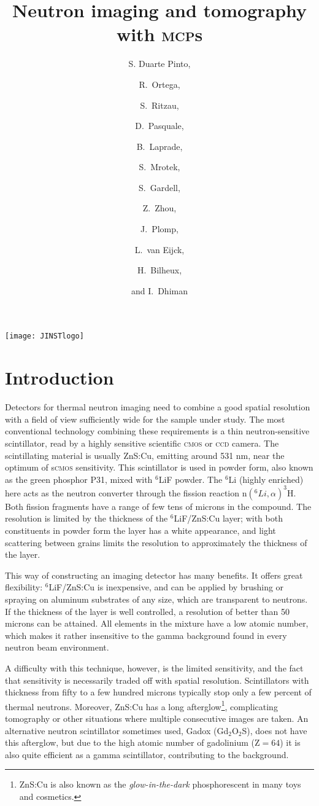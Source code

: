 \documentclass[a4paper,11pt]{article}
\title{\boldmath Neutron imaging and tomography with \textsc{mcp}s}
\author[a,1]{S. Duarte Pinto\note{Corresponding author.},}
\author[a]{R.~Ortega,}
\author[a]{S.~Ritzau,}
\author[a]{D.~Pasquale,}
\author[a]{B.~Laprade,}
\author[a]{S.~Mrotek,}
\author[a]{S.~Gardell,}
\author[b]{Z.~Zhou,}
\author[b]{J.~Plomp,}
\author[b]{L.~van Eijck,}
\author[c]{H.~Bilheux,}
\author[c]{and I.~Dhiman}
\affiliation[a]{\textsc{Photonis} Technologies S.A.S.,\\Avenue de Pythagore, 33700 M\'erignac, France}
\affiliation[b]{Delft University of Technology,\\ Mekelweg 15, 2629 JB Delft, the Netherlands}
\affiliation[c]{Oak Ridge National Laboratory,\\ 1 Bethel Valley Road, Oak Ridge, TN 37830, USA.}
\begin{document}
\noindent\texttt{[image: JINSTlogo]}\hfill
\maketitle
\section{Introduction}
Detectors for thermal neutron imaging need to combine a good spatial resolution with a field of view sufficiently wide for the sample under study.
The most conventional technology combining these requirements is a thin neutron-sensitive scintillator, read by a highly sensitive scientific \textsc{cmos} or \textsc{ccd} camera.
The scintillating material is usually ZnS:Cu, emitting around 531 nm, near the optimum of s\textsc{cmos} sensitivity.
This scintillator is used in powder form, also known as the green phosphor P31, mixed with $^6$LiF powder.
The $^6$Li (highly enriched) here acts as the neutron converter through the fission reaction $\textrm{n} (^6Li,\alpha) ^3\textrm{H}$.
Both fission fragments have a range of few tens of microns in the compound.
The resolution is limited by the thickness of the $^6$LiF/ZnS:Cu layer; with both constituents in powder form the layer has a white appearance, and light scattering between grains limits the resolution to approximately the thickness of the layer.

This way of constructing an imaging detector has many benefits.
It offers great flexibility: $^6$LiF/ZnS:Cu is inexpensive, and can be applied by brushing or spraying on aluminum substrates of any size, which are transparent to neutrons.
If the thickness of the layer is well controlled, a resolution of better than 50 microns can be attained.
All elements in the mixture have a low atomic number, which makes it rather insensitive to the gamma background found in every neutron beam environment.

A difficulty with this technique, however, is the limited sensitivity, and the fact that sensitivity is necessarily traded off with spatial resolution.
Scintillators with thickness from fifty to a few hundred microns typically stop only a few percent of thermal neutrons.
Moreover, ZnS:Cu has a long afterglow\footnote{ZnS:Cu is also known as the \emph{glow-in-the-dark} phosphorescent in many toys and cosmetics.}, complicating tomography or other situations where multiple consecutive images are taken.
An alternative neutron scintillator sometimes used, Gadox (Gd$_2$O$_2$S), does not have this afterglow, but due to the high atomic number of gadolinium ($\textrm{Z}=64$) it is also quite efficient as a gamma scintillator, contributing to the background.
\end{document}
